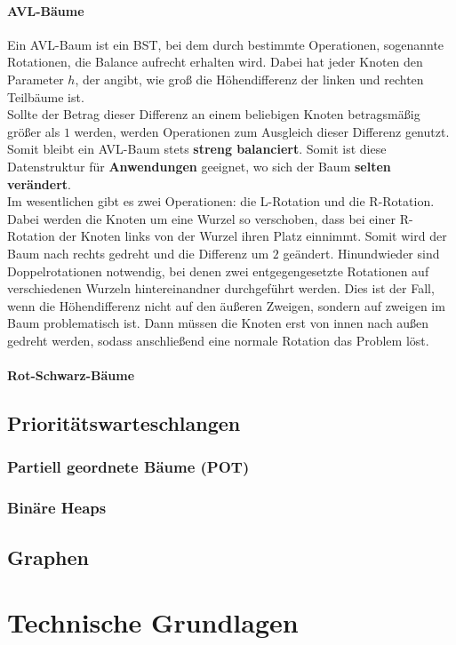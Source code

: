 \documentclass{article}
\begin{document}
\paragraph{AVL-Bäume}
Ein AVL-Baum ist ein BST, bei dem durch bestimmte Operationen, sogenannte Rotationen, die Balance aufrecht erhalten wird. Dabei hat jeder Knoten den Parameter $h$, der angibt, wie groß die Höhendifferenz der linken und rechten Teilbäume ist.\\
Sollte der Betrag dieser Differenz an einem beliebigen Knoten betragsmäßig größer als $1$ werden, werden Operationen zum Ausgleich dieser Differenz genutzt. Somit bleibt ein AVL-Baum stets \textbf{streng balanciert}. Somit ist diese Datenstruktur für \textbf{Anwendungen} geeignet, wo sich der Baum \textbf{selten verändert}.\\
Im wesentlichen gibt es zwei Operationen: die L-Rotation und die R-Rotation. Dabei werden die Knoten um eine Wurzel so verschoben, dass bei einer R-Rotation der Knoten links von der Wurzel ihren Platz einnimmt. Somit wird der Baum nach rechts gedreht und die Differenz um $2$ geändert. Hinundwieder sind Doppelrotationen notwendig, bei denen zwei entgegengesetzte Rotationen auf verschiedenen Wurzeln hintereinandner durchgeführt werden. Dies ist der Fall, wenn die Höhendifferenz nicht auf den äußeren Zweigen, sondern auf zweigen im Baum problematisch ist. Dann müssen die Knoten erst von innen nach außen gedreht werden, sodass anschließend eine normale Rotation das Problem löst.
\paragraph{Rot-Schwarz-Bäume}
\subsection{Prioritätswarteschlangen}
\subsubsection{Partiell geordnete Bäume (POT)}
\subsubsection{Binäre Heaps}
\subsection{Graphen}
\section{Technische Grundlagen}
\end{document}
